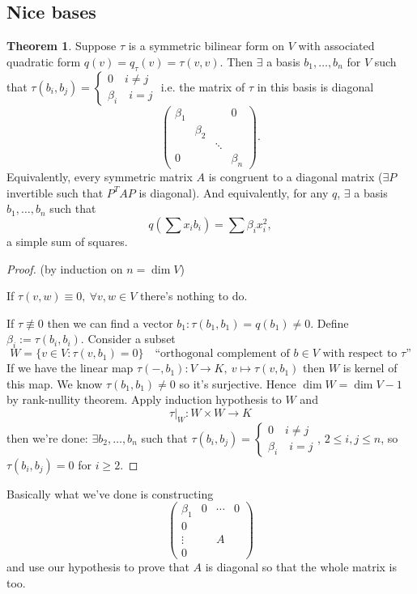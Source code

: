 \documentclass[a4paper]{article}
\theoremstyle{definition}
\newtheorem{thm}[defn]{Theorem}
\begin{document}
\subsection{Nice bases}
\begin{thm}
Suppose $\tau$ is a symmetric bilinear form on $V$ with associated quadratic form $q(v)=q_\tau (v)=\tau (v,v).$ Then $\exists$ a basis $b_1,\ldots ,b_n$ for $V$ such that $\tau (b_i,b_j) = \left\{\begin{aligned}0\quad i\neq j \\ \beta_i \quad i=j \end{aligned} \right.$ i.e. the matrix of $\tau$ in this basis is diagonal
\[
\begin{pmatrix} \beta_1 & & & 0 \\ & \beta_2 & & \\ & & \ddots & \\ 0 & & & \beta_n\end{pmatrix}.
\]
Equivalently, every symmetric matrix $A$ is congruent to a diagonal matrix ($\exists P$ invertible such that $P^TAP$ is diagonal). And equivalently, for any $q$, $\exists$ a basis $b_1,\ldots ,b_n$ such that
\[
q\left(\sum x_i b_i\right)=\sum \beta_i x_i^2 ,
\]
a simple sum of squares.
\end{thm}
\begin{proof} (by induction on $n=\dim V$)

If $\tau (v,w)\equiv 0,\ \forall v,w\in V$ there's nothing to do.

If $\tau \not\equiv 0$ then we can find a vector $b_1 : \tau (b_1,b_1)=q(b_1)\neq 0$. Define $\beta_i := \tau (b_i,b_i).$ Consider a subset
\[
W=\{v\in V : \tau (v,b_1)=0\} \quad \text{``orthogonal complement of } b\in V\text{ with respect to }\tau \text{''}
\]
If we have the linear map $\tau(-,b_1):V\rightarrow K,\ v\mapsto \tau(v,b_1)$ then $W$ is kernel of this map. We know $\tau (b_1,b_1)\neq 0$ so it's surjective. Hence $\dim W=\dim V-1$ by rank-nullity theorem. Apply induction hypothesis to $W$ and
\[
\left.\tau\right|_W : W\times W \rightarrow K
\]
then we're done: $\exists b_2,\ldots,b_n$ such that $\tau (b_i,b_j)=\left\{\begin{aligned}0\quad i\neq j \\ \beta_i \quad i=j \end{aligned} \right.$, $2\leq i,j \leq n$, so $\tau (b_i,b_j)=0$ for $i\geq 2$.
\end{proof}
Basically what we've done is constructing
\[
\begin{pmatrix}\beta_1 & 0 & \cdots & 0 \\ 0 \\ \vdots & & A \\ 0\end{pmatrix}
\]
and use our hypothesis to prove that $A$ is diagonal so that the whole matrix is too.
\end{document}
